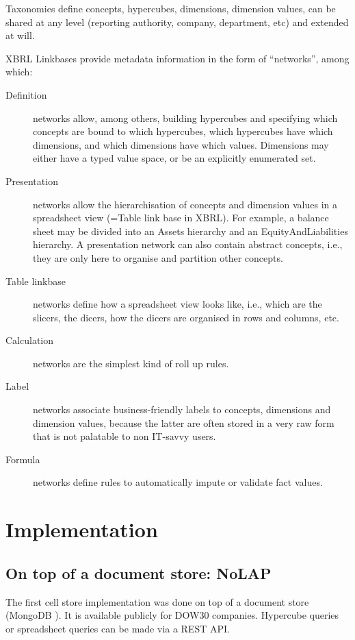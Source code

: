 \documentclass{acm_proc_article-sp}
\begin{document}
Taxonomies define concepts, hypercubes, dimensions, dimension values, can be shared at any level (reporting authority, company, department, etc) and extended at will.

XBRL Linkbases provide metadata information in the form of ``networks'', among which:

\begin{description}
\item[Definition] networks allow, among others, building hypercubes and specifying which concepts are bound to which hypercubes, which hypercubes have which dimensions, and which dimensions have which values. Dimensions may either have a typed value space, or be an explicitly enumerated set. 
\item[Presentation] networks allow the hierarchisation of concepts and dimension values in a spreadsheet view (=Table link base in XBRL). For example, a balance sheet may be divided into an Assets hierarchy and an EquityAndLiabilities hierarchy. A presentation network can also contain abstract concepts, i.e., they are only here to organise and partition other concepts. 
\item[Table linkbase] networks define how a spreadsheet view looks like, i.e., which are the slicers, the dicers, how the dicers are organised in rows and columns, etc.
\item[Calculation] networks are the simplest kind of roll up rules.
\item[Label] networks associate business-friendly labels to concepts, dimensions and dimension values, because the latter are often stored in a very raw form that is not palatable to non IT-savvy users.
\item[Formula] networks define rules to automatically impute or validate fact values.
\end{description}

\section{Implementation}
\label{section-implementation}

\subsection{On top of a document store: NoLAP}

The first cell store implementation was done on top of a document store (MongoDB \cite{MongoDB}). It is available publicly \cite{SECXBRL.info} for DOW30 companies. Hypercube queries or spreadsheet queries can be made via a REST API.
\end{document}
